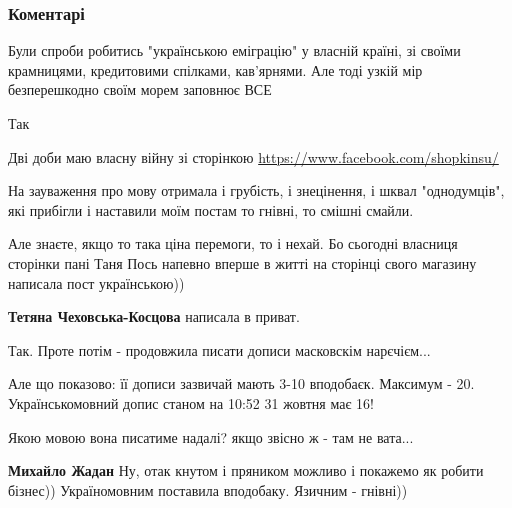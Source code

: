  
 
 
 
 
\subsubsection{Коментарі}
\label{sec:30_10_2021.fb.chornoguz_jaryna.1.ubogist_mova_servis.cmt}

\begin{itemize} %

Були спроби робитись "українською еміграцію" у власній країні, зі своїми
крамницями, кредитовими спілками, кав'ярнями. Але тоді узкій мір безперешкодно
своїм морем заповнює ВСЕ

Так


Дві доби маю власну війну зі сторінкою \url{https://www.facebook.com/shopkinsu/}

На зауваження про мову отримала і грубість, і знецінення, і шквал "однодумців",
які прибігли і наставили моїм постам то гнівні, то смішні смайли.

Але знаєте, якщо то така ціна перемоги, то і нехай. Бо сьогодні власниця
сторінки пані Таня Пось напевно вперше в житті на сторінці свого магазину
написала пост українською))

\begin{itemize} %
\textbf{Тетяна Чеховська-Косцова} написала в приват.


Так. Проте потім - продовжила писати дописи масковскім нарєчієм...

Але що показово: її дописи зазвичай мають 3-10 вподобаєк. Максимум - 20.
Українськомовний допис станом на 10:52 31 жовтня має 16!

Якою мовою вона писатиме надалі? якщо звісно ж - там не вата...

\textbf{Михайло Жадан}
Ну, отак кнутом і пряником можливо і покажемо як робити бізнес))
Україномовним поставила вподобаку. Язичним - гнівні))
\end{itemize} %


\end{itemize}
